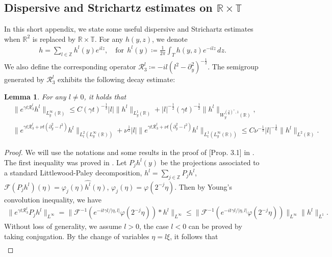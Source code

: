 \documentclass[11pt,reqno]{article}
\newtheorem{lemm}[theo]{Lemma}
\numberwithin{equation}{section}
\newcommand\R{{\mathbb R}}
\newcommand\T{{\mathbb T}}
\newcommand\Z{{\mathbb Z}}
\newcommand \tri {\coloneqq}
\let\pa=\partial
\let\f=\frac
\begin{document}
\begin{appendices}
\subsection{Dispersive and Strichartz estimates on \texorpdfstring{$\R\times \T$}{R x T}}
In this short appendix, we state some useful dispersive and Strichartz estimates when $\R^2$ is replaced by $\R\times \T.$
For any $h(y,z)$, we denote
\begin{align*}
   h=\sum_{l\in\Z} h^l(y) e^{ilz},\quad \text{for}~~
    h^l(y)\tri\f{1}{2\pi}\int_{T}h(y,z)e^{-ilz}\,dz.
\end{align*}
We also define the corresponding operator $\mathcal{R}_3^l\tri -il(l^2-\pa_y^2)^{-\f12}$.
The semigroup generated by $\mathcal{R}^l_3$ exhibits the following decay estimate:
\begin{lemm}\label{lem:disp-T}
    For any $l\not=0$, it holds that 
    \begin{align}\label{disp-RT-0}
        &\|e^{\gamma t \mathcal{R}_3^l} h^l\|_{L^\infty_y(\R)} 
        \leq C 
        (\gamma t)^{-\f13}
        |l|\|h^l\|_{L^1_y(\R)}+|l|^{-\f12}(\gamma t)^{-\f12}\|h^l\|_{W^{(\f32)^+,1}_y(\R)},\\ \label{disp-RT}
        &\|e^{\gamma t \mathcal{R}_3^l+\nu t(\partial_y^2-l^2)}h^l\|_{L_t^2(L_y^{\infty}(\R))}+\nu^{\f12}|l|\|e^{\gamma t \mathcal{R}_3^l+\nu t(\partial_y^2-l^2)}h^l\|_{L_t^1(L_y^{\infty}(\R))}\leq C \nu^{-\f13} |l|^{-\f16}\|h^l\|_{L^{2}(\R)}.
    \end{align}
\end{lemm}
\begin{proof}
    We will use the notations and some results in  the proof of [Prop. 3.1] in \cite{Coti-Zotto-Widmayer}. The first inequality was proved in \cite{Coti-Zotto-Widmayer}. Let $P_jh^l(y)$ be the projections
 associated to a standard Littlewood-Paley decomposition, $h^l=\sum_{j\in\Z}P_jh^l$, $\mathcal{F}(P_jh^l)(\eta)=\varphi_j(\eta)\hat{h^l}(\eta)$, $\varphi_j(\eta)=\varphi(2^{-j}\eta)$. 
 Then by Young's convolution inequality, we have
\begin{align}\label{h1}
        \|e^{\gamma t \mathcal{R}_3^l}P_jh^l\|_{L^{\infty}}=\|\mathcal{F}^{-1}(e^{-it\gamma l/|\eta,l|}\varphi(2^{-j}\eta))*h^l\|_{L^{\infty}}\leq\|\mathcal{F}^{-1}(e^{-it\gamma l/|\eta,l|}\varphi(2^{-j}\eta))\|_{L^{\infty}}\|h^l\|_{L^{1}}.
    \end{align}  
Without loss of generality, we assume $l>0$, the case $l<0$ can be proved by taking conjugation. 
By the change of variables $ \eta=l\xi$, it follows that
\begin{align*}

\end{align*}
\end{proof}
\end{appendices}
\end{document}
